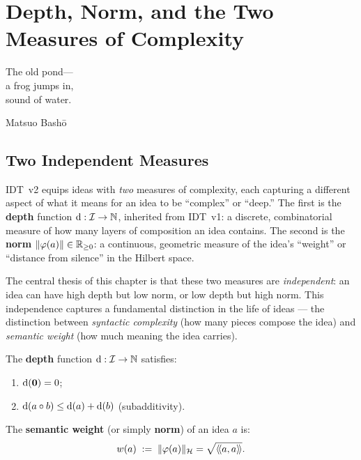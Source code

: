 \chapter{Depth, Norm, and the Two Measures of Complexity}
\label{ch:depth-norm}

\epigraph{The old pond---\\a frog jumps in,\\sound of water.}{Matsuo Bash\=o}

\section{Two Independent Measures}

IDT~v2 equips ideas with \emph{two} measures of complexity, each capturing a
different aspect of what it means for an idea to be ``complex'' or ``deep.''
The first is the \textbf{depth} function $\operatorname{d} : \mathcal{I} \to \mathbb{N}$,
inherited from IDT~v1: a discrete, combinatorial measure of how many layers
of composition an idea contains. The second is the \textbf{norm}
$\lVert \varphi(a) \rVert \in \mathbb{R}_{\geq 0}$: a continuous, geometric measure
of the idea's ``weight'' or ``distance from silence'' in the Hilbert space.

The central thesis of this chapter is that these two measures are
\emph{independent}: an idea can have high depth but low norm, or low depth but
high norm. This independence captures a fundamental distinction in the life
of ideas --- the distinction between \emph{syntactic complexity} (how many
pieces compose the idea) and \emph{semantic weight} (how much meaning the
idea carries).

\begin{definition}[Depth]
\label{def:depth-v2}
The \textbf{depth} function $\operatorname{d} : \mathcal{I} \to \mathbb{N}$ satisfies:
\begin{enumerate}
\item $\operatorname{d}(\mathbf{0}) = 0$;
\item $\operatorname{d}(a \circ b) \leq \operatorname{d}(a) + \operatorname{d}(b)$ (subadditivity).
\end{enumerate}
\end{definition}

\begin{definition}
\label{def:norm-weight}
The \textbf{semantic weight} (or simply \textbf{norm}) of an idea $a$ is:
\[
  w(a) \;:=\; \lVert \varphi(a) \rVert_{\mathcal{H}} = \sqrt{\langle\!\langle a, a \rangle\!\rangle}.
\]
\end{definition}

